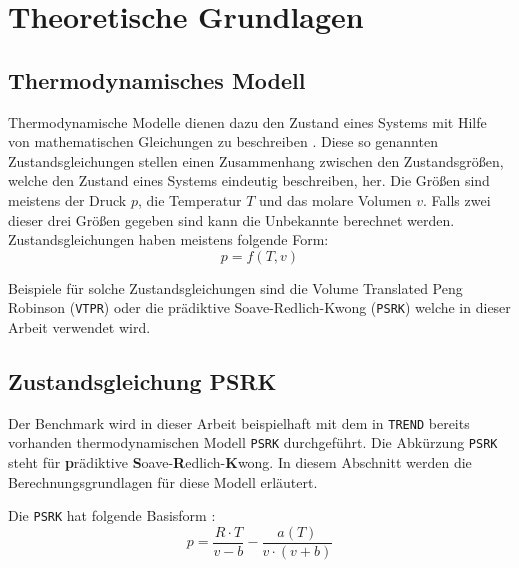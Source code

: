 \documentclass[../thesis.tex]{subfiles}
\begin{document}
	
\makeatletter %
\makeatother

\chapter{Theoretische Grundlagen}
\label{chp: grundlagen}

\section{Thermodynamisches Modell}

Thermodynamische Modelle dienen dazu den Zustand eines Systems mit Hilfe von mathematischen Gleichungen zu beschreiben \cite{atkins2006atkins}. Diese so genannten Zustandsgleichungen stellen einen Zusammenhang zwischen den Zustandsgrößen, welche den Zustand eines Systems eindeutig beschreiben, her. Die Größen sind meistens der Druck $p$, die Temperatur $T$ und das molare Volumen $v$. Falls zwei dieser drei Größen gegeben sind kann die Unbekannte berechnet werden. Zustandsgleichungen haben meistens folgende Form:
\begin{equation}
	p = f(T,v)
\end{equation}

Beispiele für solche Zustandsgleichungen sind die Volume Translated Peng Robinson (\texttt{VTPR}) \cite{ahlers2002development} oder die prädiktive Soave-Redlich-Kwong (\texttt{PSRK}) \cite{HOLDERBAUM1991251} welche in dieser Arbeit verwendet wird.

\section{Zustandsgleichung PSRK}

Der Benchmark wird in dieser Arbeit beispielhaft mit dem in \texttt{TREND} bereits vorhanden thermodynamischen Modell \texttt{PSRK} durchgeführt. Die Abkürzung \texttt{PSRK} steht für \textbf{p}rädiktive \textbf{S}oave-\textbf{R}edlich-\textbf{K}wong. In diesem Abschnitt werden die Berechnungsgrundlagen für diese Modell erläutert.

Die \texttt{PSRK} hat folgende Basisform \cite{HOLDERBAUM1991251}:
\begin{equation}
	p = \dfrac{R \cdot T}{v - b}- \dfrac{a(T)}{v \cdot (v + b)}
\end{equation}
\end{document}
